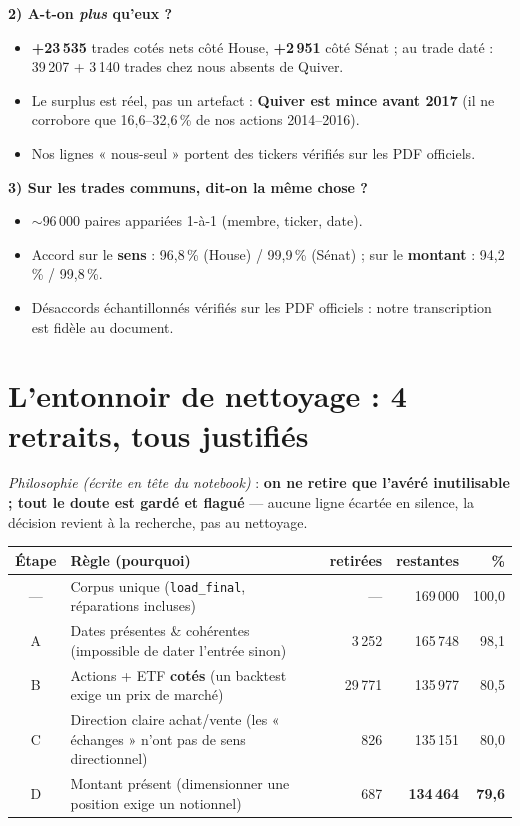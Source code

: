 \documentclass[10pt,a4paper]{article}
\newcommand{\code}[1]{\texttt{\small #1}}
\begin{document}
\textbf{2) A-t-on \emph{plus} qu'eux ?}
\begin{itemize}
\item \textbf{+23\,535} trades cotés nets côté House, \textbf{+2\,951} côté Sénat ; au trade daté :
      39\,207 + 3\,140 trades chez nous absents de Quiver.
\item Le surplus est réel, pas un artefact : \textbf{Quiver est mince avant 2017} (il ne corrobore que
      16{,}6--32{,}6\,\% de nos actions 2014--2016).
\item Nos lignes « nous-seul » portent des tickers vérifiés sur les PDF officiels.
\end{itemize}

\textbf{3) Sur les trades communs, dit-on la même chose ?}
\begin{itemize}
\item $\sim$96\,000 paires appariées 1-à-1 (membre, ticker, date).
\item Accord sur le \textbf{sens} : 96{,}8\,\% (House) / 99{,}9\,\% (Sénat) ; sur le \textbf{montant} :
      94{,}2\,\% / 99{,}8\,\%.
\item Désaccords échantillonnés vérifiés sur les PDF officiels : notre transcription est fidèle au document.
\end{itemize}

\section{L'entonnoir de nettoyage : 4 retraits, tous justifiés}

\emph{Philosophie (écrite en tête du notebook)} : \textbf{on ne retire que l'avéré inutilisable ; tout le
doute est gardé et flagué} --- aucune ligne écartée en silence, la décision revient à la recherche, pas au
nettoyage.

\begin{center}\small
\begin{tabular}{clrrr}
\toprule
Étape & Règle (pourquoi) & retirées & restantes & \% \\
\midrule
--- & Corpus unique (\code{load\_final}, réparations incluses) & --- & 169\,000 & 100{,}0 \\
A & Dates présentes \& cohérentes (impossible de dater l'entrée sinon) & 3\,252 & 165\,748 & 98{,}1 \\
B & Actions + ETF \textbf{cotés} (un backtest exige un prix de marché) & 29\,771 & 135\,977 & 80{,}5 \\
C & Direction claire achat/vente (les « échanges » n'ont pas de sens directionnel) & 826 & 135\,151 & 80{,}0 \\
D & Montant présent (dimensionner une position exige un notionnel) & 687 & \textbf{134\,464} & \textbf{79{,}6} \\
\bottomrule
\end{tabular}
\end{center}
\end{document}
